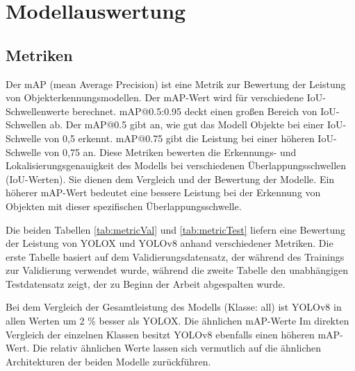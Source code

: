 \chapter{Modellauswertung}
\section{Metriken}
Der mAP (mean Average Precision) ist eine Metrik zur Bewertung der Leistung von Objekterkennungsmodellen. Der mAP-Wert wird für verschiedene IoU-Schwellenwerte berechnet. mAP@0.5:0.95 deckt einen großen Bereich von IoU-Schwellen ab. Der mAP@0.5 gibt an, wie gut das Modell Objekte bei einer IoU-Schwelle von 0,5 erkennt. mAP@0.75 gibt die Leistung bei einer höheren IoU-Schwelle von 0,75 an. Diese Metriken bewerten die Erkennungs- und Lokalisierungsgenauigkeit des Modells bei verschiedenen Überlappungsschwellen (IoU-Werten). Sie dienen dem Vergleich und der Bewertung der Modelle. Ein höherer mAP-Wert bedeutet eine bessere Leistung bei der Erkennung von Objekten mit dieser spezifischen Überlappungsschwelle.

Die beiden Tabellen \ref{tab:metricVal} und \ref{tab:metricTest} liefern eine Bewertung der Leistung von YOLOX und YOLOv8 anhand verschiedener Metriken. Die erste Tabelle basiert auf dem Validierungsdatensatz, der während des Trainings zur Validierung verwendet wurde, während die zweite Tabelle den unabhängigen Testdatensatz zeigt, der zu Beginn der Arbeit abgespalten wurde.

Bei dem Vergleich der Gesamtleistung des Modells (Klasse: all) ist YOLOv8 in allen Werten um 2 \% besser als YOLOX. Die ähnlichen mAP-Werte Im direkten Vergleich der einzelnen Klassen besitzt YOLOv8 ebenfalls einen höheren mAP-Wert. Die relativ ähnlichen Werte lassen sich vermutlich auf die ähnlichen Architekturen der beiden Modelle zurückführen.

